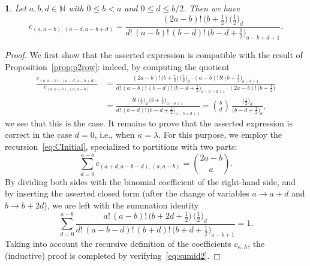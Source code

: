 \documentclass[10pt,oneside,american]{amsart}
\numberwithin{equation}{section}
\numberwithin{figure}{section}
\theoremstyle{plain}
\newtheorem{thm}{\protect\theoremname}[section]
\theoremstyle{definition}
\theoremstyle{remark}
\theoremstyle{plain}
\theoremstyle{definition}
\theoremstyle{plain}
\theoremstyle{plain}
\providecommand{\theoremname}{Theorem}
\begin{document}
\begin{thm}\label{thm:cf2}
  Let $a,b,d\in\mathbb{N}$ with $0\leq b<a$ and $0\leq d\leq b/2$.
  Then we have
  \[
    c_{(a,a-b),(a-d,a-b+d)} = 
    \frac{(2a-b)! \, \bigl(b+\frac12\bigr) \, \bigl(\frac12\bigr)_{\!d}}
         {d! \, (a-b)! \, (b-d)! \, \bigl(b-d+\frac12\bigr)_{\!a-b+d+1}}.
  \]
\end{thm}
\begin{proof}
  We first show that the asserted expression is compatible with the result of
  Proposition~\ref{prop:p2row}: indeed, by computing the quotient
  \begin{align*}
    \frac{c_{(a,a-b),(a-d,a-b+d)}}{c_{(a,a-b),(a,a-b)}} &=
    \frac{(2a-b)! \, \bigl(b+\frac12\bigr) \, \bigl(\frac12\bigr)_{\!d} \cdot
      (a-b)! \, b! \, \bigl(b+\frac12\bigr)_{\!a-b+1}}
      {d! \, (a-b)! \, (b-d)! \, \bigl(b-d+\frac12\bigr)_{\!a-b+d+1} \cdot
        (2a-b)! \, \bigl(b+\frac12\bigr)} \\
    &= \frac{b! \, \bigl(\frac12\bigr)_{\!d} \, \bigl(b+\frac12\bigr)_{\!a-b+1}}
      {d! \, (b-d)! \, \bigl(b-d+\frac12\bigr)_{\!a-b+d+1}}
    = \binom{b}{d}\,\frac{\bigl(\frac12\bigr)_{\!d}}{\bigl(b-d+\frac12\bigr)_{\!d}},
  \end{align*}
  we see that this is the case. It remains to prove that the asserted
  expression is correct in the case $d=0$, i.e., when $\kappa=\lambda$.  For
  this purpose, we employ the recursion~\eqref{eq:CInitial}, specialized to
  partitions with two parts:
  \begin{equation}\label{eq:CInitial2}
    \sum_{d=0}^{a-b} c_{(a+d,a-b-d),(a,a-b)} = \binom{2a-b}{a}.
  \end{equation}
  By dividing both sides with the binomial coefficient of the right-hand side,
  and by inserting the asserted closed form (after the change of variables
  $a\to a+d$ and $b\to b+2d$), we are left with the summation identity
  \begin{equation}\label{eq:sumid2}
    \sum_{d=0}^{a-b}
    \frac{a! \, (a-b)! \, \bigl(b+2d+\frac{1}{2}\bigr) \, \bigl(\frac{1}{2}\bigr)_{\!d}}
         {d! \, (a-b-d)! \, (b+d)! \, \bigl(b+d+\frac12\bigr)_{\!a-b+1}} = 1.
  \end{equation}
  Taking into account the recursive definition of the coefficients
  $c_{\kappa,\lambda}$, the (inductive) proof is completed by
  verifying~\eqref{eq:sumid2}.


\end{proof}
\end{document}
